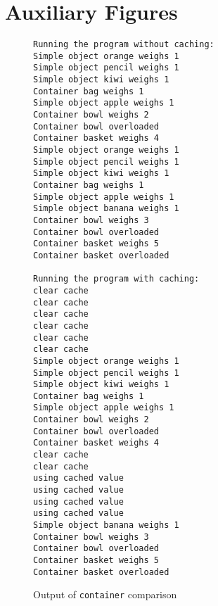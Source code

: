 \documentclass{article}
\newcommand{\code}[1]{\texttt{#1}}
\begin{document}



\pagebreak
\appendix
\section{Auxiliary Figures}

\begin{figure}[h!]
\caption{Output of \code{container} comparison}
\label{container-output}
\small
\begin{verbatim}
Running the program without caching:
Simple object orange weighs 1
Simple object pencil weighs 1
Simple object kiwi weighs 1
Container bag weighs 1
Simple object apple weighs 1
Container bowl weighs 2
Container bowl overloaded
Container basket weighs 4
Simple object orange weighs 1
Simple object pencil weighs 1
Simple object kiwi weighs 1
Container bag weighs 1
Simple object apple weighs 1
Simple object banana weighs 1
Container bowl weighs 3
Container bowl overloaded
Container basket weighs 5
Container basket overloaded

Running the program with caching:
clear cache
clear cache
clear cache
clear cache
clear cache
clear cache
Simple object orange weighs 1
Simple object pencil weighs 1
Simple object kiwi weighs 1
Container bag weighs 1
Simple object apple weighs 1
Container bowl weighs 2
Container bowl overloaded
Container basket weighs 4
clear cache
clear cache
using cached value
using cached value
using cached value
using cached value
Simple object banana weighs 1
Container bowl weighs 3
Container bowl overloaded
Container basket weighs 5
Container basket overloaded
\end{verbatim}
\end{figure}
\end{document}
